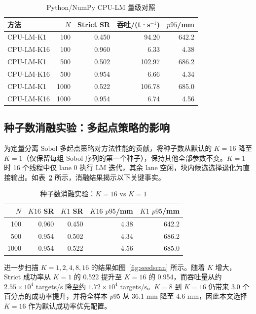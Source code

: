\documentclass[twocolumn,a4paper,10pt]{ctexart}
\begin{document}
\begin{table}[htbp]
\centering
\caption{Python/NumPy CPU-LM 量级对照}
\label{tab:cpu}
\scriptsize
\setlength{\tabcolsep}{3pt}
\begin{tabular}{lrrrr}
\toprule
方法 & $N$ & Strict SR & 吞吐/(t·s$^{-1}$) & $p95$/mm\\
\midrule
CPU-LM-K1  & 100  & 0.450 & 94.20  & 642.2\\
CPU-LM-K16 & 100  & 0.960 & 6.33   & 4.38\\
CPU-LM-K1  & 500  & 0.502 & 102.97 & 686.2\\
CPU-LM-K16 & 500  & 0.954 & 6.66   & 4.34\\
CPU-LM-K1  & 1000 & 0.522 & 106.78 & 685.0\\
CPU-LM-K16 & 1000 & 0.954 & 6.74   & 4.56\\
\bottomrule
\end{tabular}
\end{table}

\subsection{种子数消融实验：多起点策略的影响}

为定量分离 Sobol 多起点策略对方法性能的贡献，将种子数从默认的 $K=16$ 降至 $K=1$（仅保留每组 Sobol 序列的第一个种子），保持其他全部参数不变。$K=1$ 时 16 个线程中仅 lane 0 执行 LM 迭代，其余 lane 空闲，块内候选选择退化为直接输出。如表~\ref{tab:ablation} 所示，消融结果揭示以下关键事实。

\begin{table}[htbp]
\centering
\caption{种子数消融实验：$K=16$ vs $K=1$}
\label{tab:ablation}
\scriptsize
\setlength{\tabcolsep}{3pt}
\begin{tabular}{rrrrr}
\toprule
$N$ & $K16$ SR & $K1$ SR & $K16$ $p95$/mm & $K1$ $p95$/mm\\
\midrule
100  & 0.960 & 0.450 & 4.38  & 642.2\\
500  & 0.954 & 0.502 & 4.34  & 686.2\\
1000 & 0.954 & 0.522 & 4.56  & 685.0\\
\bottomrule
\end{tabular}
\end{table}

进一步扫描 $K=1,2,4,8,16$ 的结果如图~\ref{fig:seedscan} 所示。随着 $K$ 增大，Strict 成功率从 $K=1$ 的 0.522 提升至 $K=16$ 的 0.954，而吞吐量从约 $2.55\times10^4$ targets/s 降至约 $1.72\times10^4$ targets/s。$K=8$ 到 $K=16$ 仍带来 3.0 个百分点的成功率提升，并将全样本 $p95$ 从 36.1 mm 降至 4.6 mm，因此本文选择 $K=16$ 作为默认成功率优先配置。
\end{document}
